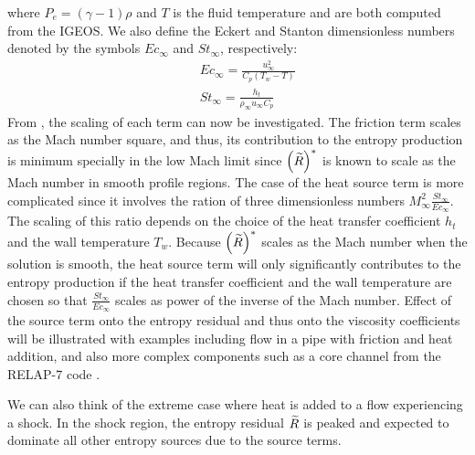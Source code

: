 %
where $P_e=(\gamma-1) \rho$ and $T$ is the fluid temperature and are both computed from the IGEOS. We also define the Eckert and Stanton dimensionless numbers denoted by the symbols $Ec_\infty$ and $St_\infty$, respectively:
%
\begin{eqnarray}\label{eq:dim_nb_src}
&&Ec_\infty = \frac{u^2_\infty}{C_p \left(T_w-T\right)} \\
&&St_\infty = \frac{h_t}{\rho_\infty u_\infty C_p}
\end{eqnarray}
%  
From , the scaling of each term can now be investigated. The friction term scales as the Mach number square, and thus, its contribution to the entropy production is minimum specially in the low Mach limit since $\left(\widetilde{R}\right)^*$ is known to scale as the Mach number in smooth profile regions. The case of the heat source term is more complicated since it involves the ration of three dimensionless numbers $M^2_\infty \frac{St_\infty}{Ec_\infty}$. The scaling of this ratio depends on the choice of the heat transfer coefficient $h_t$ and the wall temperature $T_w$. Because $\left(\widetilde{R}\right)^*$ scales as the Mach number when the solution is smooth, the heat source term will only significantly contributes to the entropy production if the heat transfer coefficient and the wall temperature are chosen so that $\frac{St_\infty}{Ec_\infty}$ scales as power of the inverse of the Mach number. Effect of the source term onto the entropy residual and thus onto the viscosity coefficients will be illustrated with examples including flow in a pipe with friction and heat addition, and also more complex components such as a core channel from the RELAP-7 code \cite{Relap7PWR}. 
%
\begin{remark}
We can also think of the extreme case where heat is added to a flow experiencing a shock. In the shock region, the entropy residual $\widetilde{R}$ is peaked and expected to dominate all other entropy sources due to the source terms. 
\end{remark}
